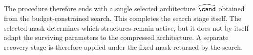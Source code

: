 The procedure therefore ends with a single selected architecture $\widehat{\cand}$ obtained from the budget-constrained search. This completes the search stage itself. The selected mask determines which structures remain active, but it does not by itself adapt the surviving parameters to the compressed architecture. A separate recovery stage is therefore applied under the fixed mask returned by the search.
